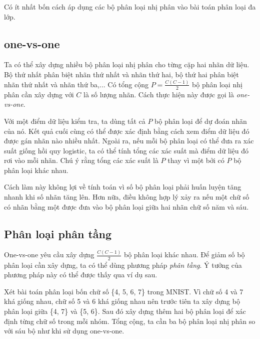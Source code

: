 
Có {ít nhất} bốn cách áp dụng các bộ phân loại nhị phân vào bài toán phân
loại đa lớp.%

\subsection{one-vs-one} 

Ta có thể xây dựng nhiều bộ phân loại nhị phân cho từng cặp hai nhãn dữ liệu. Bộ
thứ nhất phân biệt nhãn thứ nhất và nhãn thứ hai, bộ thứ hai phân biệt nhãn thứ
nhất và nhãn thứ ba,... Có tổng cộng $P = \frac{C(C-1)}{2}$ bộ phân loại nhị phân
cần xây dựng với $C$ là số lượng nhãn. Cách thực hiện này được gọi là
\textit{one-vs-one}.

Với một điểm dữ liệu kiểm tra, ta dùng tất cả $P$ bộ phân loại để dự đoán nhãn của nó. Kết quả cuối cùng có thể được xác định bằng cách
xem điểm dữ liệu đó được gán nhãn nào nhiều nhất. Ngoài ra, nếu mỗi bộ phân loại có thể đưa ra xác suất giống hồi quy logistic, ta có thể tính {tổng các xác suất} mà điểm dữ liệu đó rơi vào mỗi nhãn. Chú ý rằng tổng các xác suất là $P$ thay vì một bởi có $P$ bộ phân loại khác nhau.


Cách làm này không lợi về tính toán vì số bộ phân loại phải huấn luyện tăng
nhanh khi số nhãn tăng lên. Hơn nữa, điều không hợp lý xảy ra nếu một chữ số có nhãn bằng một được đưa vào bộ phân loại giữa hai nhãn chữ số năm và sáu. 
 
\subsection{Phân loại phân tầng}
One-vs-one yêu cầu xây dựng $\frac{C(C-1)}{2}$ bộ phân loại khác nhau. Để giảm
số bộ phân loại cần xây dựng, ta có thể dùng phương pháp \textit{phân tầng}. Ý
tưởng của phương pháp này có thể được thấy qua ví dụ sau.
 
Xét bài toán phân loại bốn chữ số \{4, 5, 6, 7\} trong
MNIST. Vì chữ số {4} và {7} khá giống nhau, chữ số
{5} và {6} khá giống nhau nên trước tiên ta xây dựng
bộ phân loại giữa \{4, 7\} và \{5, 6\}. Sau đó xây dựng thêm hai bộ phân loại 
để xác định từng chữ số trong mỗi nhóm. Tổng cộng, ta cần ba bộ phân loại nhị phân so với sáu bộ như khi sử dụng one-vs-one.  

